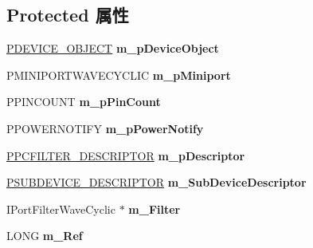 \subsection*{Protected 属性}
\begin{DoxyCompactItemize}
\item 
\mbox{\label{class_c_port_wave_cyclic_a83ff565d80b312e0c4baa527464771e0}} 
\hyperlink{struct___d_e_v_i_c_e___o_b_j_e_c_t}{P\+D\+E\+V\+I\+C\+E\+\_\+\+O\+B\+J\+E\+CT} {\bfseries m\+\_\+p\+Device\+Object}
\item 
\mbox{\label{class_c_port_wave_cyclic_a304b60bf59bf252c264f8ef2aaed24b5}} 
P\+M\+I\+N\+I\+P\+O\+R\+T\+W\+A\+V\+E\+C\+Y\+C\+L\+IC {\bfseries m\+\_\+p\+Miniport}
\item 
\mbox{\label{class_c_port_wave_cyclic_a0f82206a3c6c2b29ba6c69dbac0c2fb5}} 
P\+P\+I\+N\+C\+O\+U\+NT {\bfseries m\+\_\+p\+Pin\+Count}
\item 
\mbox{\label{class_c_port_wave_cyclic_a2103fe36baa378150fb1a35e56d79d08}} 
P\+P\+O\+W\+E\+R\+N\+O\+T\+I\+FY {\bfseries m\+\_\+p\+Power\+Notify}
\item 
\mbox{\label{class_c_port_wave_cyclic_a93be60744b48ca28a066bff0a50f3d82}} 
\hyperlink{struct_p_c_f_i_l_t_e_r___d_e_s_c_r_i_p_t_o_r}{P\+P\+C\+F\+I\+L\+T\+E\+R\+\_\+\+D\+E\+S\+C\+R\+I\+P\+T\+OR} {\bfseries m\+\_\+p\+Descriptor}
\item 
\mbox{\label{class_c_port_wave_cyclic_aa3ea1ed05dc1352826bb137ab1c5c400}} 
\hyperlink{struct_s_u_b_d_e_v_i_c_e___d_e_s_c_r_i_p_t_o_r}{P\+S\+U\+B\+D\+E\+V\+I\+C\+E\+\_\+\+D\+E\+S\+C\+R\+I\+P\+T\+OR} {\bfseries m\+\_\+\+Sub\+Device\+Descriptor}
\item 
\mbox{\label{class_c_port_wave_cyclic_aeed8df2ba76c937438577ea1dc3c7787}} 
I\+Port\+Filter\+Wave\+Cyclic $\ast$ {\bfseries m\+\_\+\+Filter}
\item 
\mbox{\label{class_c_port_wave_cyclic_aa605894dcdf6ba7a1998ba89d20ba5b7}} 
L\+O\+NG {\bfseries m\+\_\+\+Ref}
\end{DoxyCompactItemize}
